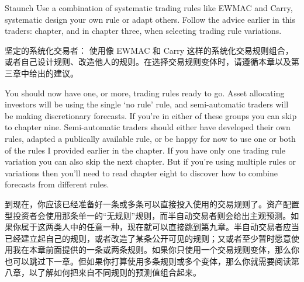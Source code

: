 \bipairgap

\begin{englishblock} Staunch Use a combination of systematic trading rules like EWMAC and Carry, systematic design your own rule or adapt others. Follow the advice earlier in this traders: chapter, and in chapter three, when selecting trading rule variations. \end{englishblock}

\begin{chineseblock}坚定的系统化交易者： 使用像 EWMAC 和 Carry 这样的系统化交易规则组合，或者自己设计规则、改造他人的规则。在选择交易规则变体时，请遵循本章以及第三章中给出的建议。\end{chineseblock}

\bipairgap

\begin{englishblock} You should now have one, or more, trading rules ready to go. Asset allocating investors will be using the single ‘no rule' rule, and semi-automatic traders will be making discretionary forecasts. If you're in either of these groups you can skip to chapter nine. Semi-automatic traders should either have developed their own rules, adapted a publically available rule, or be happy for now to use one or both of the rules I provided earlier in the chapter. If you have only one trading rule variation you can also skip the next chapter. But if you're using multiple rules or variations then you'll need to read chapter eight to discover how to combine forecasts from different rules. \end{englishblock}

\begin{chineseblock}到现在，你应该已经准备好一条或多条可以直接投入使用的交易规则了。资产配置型投资者会使用那条单一的“无规则”规则，而半自动交易者则会给出主观预测。如果你属于这两类人中的任意一种，现在就可以直接跳到第九章。半自动交易者应当已经建立起自己的规则，或者改造了某条公开可见的规则；又或者至少暂时愿意使用我在本章前面提供的一条或两条规则。如果你只使用一个交易规则变体，那么你也可以跳过下一章。但如果你打算使用多条规则或多个变体，那么你就需要阅读第八章，以了解如何把来自不同规则的预测值组合起来。\end{chineseblock}
